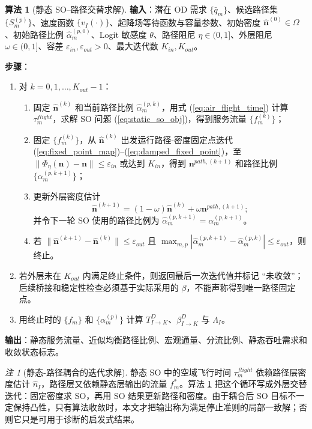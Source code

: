 \documentclass[a4paper,12pt]{article}
\theoremstyle{plain}
\theoremstyle{definition}
\newtheorem{algorithm}[theorem]{算法}
\theoremstyle{remark}
\newtheorem{remark}[theorem]{注}
\begin{document}
\begin{algorithm}[静态 SO--路径交替求解]\label{alg:static_path_coupling}
\textbf{输入}：潜在 OD 需求 $\{\bar q_m\}$、候选路径集 $\{S_m^{(p)}\}$、速度函数 $\{v_I(\cdot)\}$、起降场等待函数与容量参数、初始密度 $\hat{\bm n}^{(0)}\in\Omega$、初始路径比例 $\widehat\alpha_m^{(p,0)}$、Logit 敏感度 $\theta$、路径阻尼 $\eta\in(0,1]$、外层阻尼 $\omega\in(0,1]$、容差 $\varepsilon_{in},\varepsilon_{out}>0$、最大迭代数 $K_{in},K_{out}$。

\textbf{步骤}：
\begin{enumerate}
    \item 对 $k=0,1,\ldots,K_{out}-1$：
    \begin{enumerate}
        \item 固定 $\hat{\bm n}^{(k)}$ 和当前路径比例 $\widehat\alpha_m^{(p,k)}$，用式 (\ref{eq:air_flight_time}) 计算 $\tau_m^{flight}$，求解 SO 问题 (\ref{eq:static_so_obj})，得到服务流量 $\{f_m^{(k)}\}$；
        \item 固定 $\{f_m^{(k)}\}$，从 $\hat{\bm n}^{(k)}$ 出发运行路径-密度固定点迭代 (\ref{eq:fixed_point_map})--(\ref{eq:damped_fixed_point})，至 $\|\Phi_\eta(\bm n)-\bm n\|\le\varepsilon_{in}$ 或达到 $K_{in}$，得到 $\bm n^{path,(k+1)}$ 和路径比例 $\{\alpha_m^{(p,k+1)}\}$；
        \item 更新外层密度估计
        \begin{equation}
            \hat{\bm n}^{(k+1)}=(1-\omega)\hat{\bm n}^{(k)}+\omega\bm n^{path,(k+1)} ;
        \end{equation}
        并令下一轮 SO 使用的路径比例为 $\widehat\alpha_m^{(p,k+1)}=\alpha_m^{(p,k+1)}$。
        \item 若 $\|\hat{\bm n}^{(k+1)}-\hat{\bm n}^{(k)}\|\le\varepsilon_{out}$ 且 $\max_{m,p}|\widehat\alpha_m^{(p,k+1)}-\widehat\alpha_m^{(p,k)}|\le\varepsilon_{out}$，则终止。
    \end{enumerate}
    \item 若外层未在 $K_{out}$ 内满足终止条件，则返回最后一次迭代值并标记 ``未收敛''；后续桥接和稳定性检查必须基于实际采用的 $\beta$，不能声称得到唯一路径固定点。
    \item 用终止时的 $\{f_m\}$ 和 $\{\alpha_m^{(p)}\}$ 计算 $T_{I\to K}^D$、$\beta_{I\to K}^D$ 与 $\Lambda_I$。
\end{enumerate}

\textbf{输出}：静态服务流量、近似均衡路径比例、宏观通量、分流比例、静态吞吐需求和收敛状态标志。
\end{algorithm}

\begin{remark}[静态-路径耦合的迭代求解]\label{rem:static_path_coupling}
静态 SO 中的空域飞行时间 $\tau_m^{flight}$ 依赖路径层密度估计 $\hat n_I$，路径层又依赖静态层输出的流量 $f_m^*$。算法 \ref{alg:static_path_coupling} 把这个循环写成外层交替迭代：固定密度求 SO，再用 SO 结果更新路径和密度。由于耦合后 SO 目标不一定保持凸性，只有算法收敛时，本文才把输出称为满足停止准则的局部一致解；否则它只是可用于诊断的启发式结果。
\end{remark}
\end{document}
